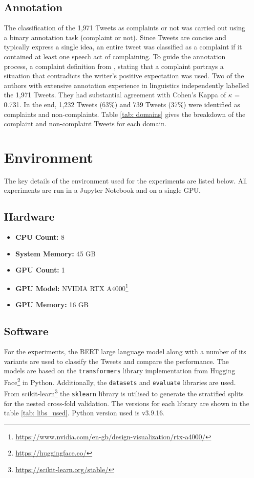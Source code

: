 \subsection{Annotation}
The classification of the 1,971 Tweets as complaints or not was carried out using a binary annotation task (complaint or not). Since Tweets are concise and typically express a single idea, an entire tweet was classified as a complaint if it contained at least one speech act of complaining. To guide the annotation process, a complaint definition from \cite{olshtain_speechact_1987}, stating that a complaint portrays a situation that contradicts the writer's positive expectation was used. Two of the authors with extensive annotation experience in linguistics independently labelled the 1,971 Tweets. They had substantial agreement \cite{artsteinInterCoderAgreementComputational2008} with Cohen's Kappa of $\kappa$ = 0.731. In the end, 1,232 Tweets (63\%) and 739 Tweets (37\%) were identified as complaints and non-complaints. Table \ref{tab: domains} gives the breakdown of the complaint and non-complaint Tweets for each domain.

\section{Environment}

The key details of the environment used for the experiments are listed below. All experiments are run in a Jupyter Notebook and on a single GPU.
\subsection{Hardware}
\begin{itemize}
    \small
    \item \textbf{CPU Count:} 8
    \item \textbf{System Memory:} 45 GB
    \item \textbf{GPU Count:} 1
    \item \textbf{GPU Model:} NVIDIA RTX A4000\footnote{\url{https://www.nvidia.com/en-gb/design-visualization/rtx-a4000/}}
    \item \textbf{GPU Memory:} 16 GB
\end{itemize}

\subsection{Software}
For the experiments, the BERT large language model along with a number of its variants are used to classify the Tweets and compare the performance. The models are based on the \texttt{transformers} library implementation from Hugging Face\footnote{\url{https://huggingface.co/}} \cite{wolfHuggingFaceTransformersStateoftheart2020} in Python. Additionally, the \texttt{datasets} and \texttt{evaluate} libraries are used. From scikit-learn\footnote{\url{https://scikit-learn.org/stable/}} the \texttt{sklearn} library is utilised to generate the stratified splits for the nested cross-fold validation. The versions for each library are shown in the table \ref{tab: libs_used}. Python version used is v3.9.16.

